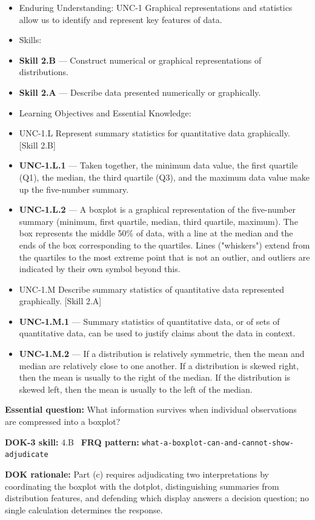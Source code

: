 \documentclass[11pt]{article}
\begin{document}


{\small
\begin{itemize}[leftmargin=1.5em,itemsep=2pt,topsep=2pt]
  \item Enduring Understanding: UNC-1 Graphical representations and statistics allow us to identify and represent key features of data.
  \item Skills:
  \item \textbf{Skill 2.B} --- Construct numerical or graphical representations of distributions.
  \item \textbf{Skill 2.A} --- Describe data presented numerically or graphically.
  \item Learning Objectives and Essential Knowledge:
  \item UNC-1.L Represent summary statistics for quantitative data graphically. [Skill 2.B]
  \item \textbf{UNC-1.L.1} --- Taken together, the minimum data value, the first quartile (Q1), the median, the third quartile (Q3), and the maximum data value make up the five-number summary.
  \item \textbf{UNC-1.L.2} --- A boxplot is a graphical representation of the five-number summary (minimum, first quartile, median, third quartile, maximum). The box represents the middle 50\% of data, with a line at the median and the ends of the box corresponding to the quartiles. Lines ("whiskers") extend from the quartiles to the most extreme point that is not an outlier, and outliers are indicated by their own symbol beyond this.
  \item UNC-1.M Describe summary statistics of quantitative data represented graphically. [Skill 2.A]
  \item \textbf{UNC-1.M.1} --- Summary statistics of quantitative data, or of sets of quantitative data, can be used to justify claims about the data in context.
  \item \textbf{UNC-1.M.2} --- If a distribution is relatively symmetric, then the mean and median are relatively close to one another. If a distribution is skewed right, then the mean is usually to the right of the median. If the distribution is skewed left, then the mean is usually to the left of the median.
\end{itemize}
}
\textbf{Essential question:} What information survives when individual observations are compressed into a boxplot?\par
\textbf{DOK-3 skill:} 4.B \textperiodcentered\ \textbf{FRQ pattern:} {\small\texttt{what-\allowbreak{}a-\allowbreak{}boxplot-\allowbreak{}can-\allowbreak{}and-\allowbreak{}cannot-\allowbreak{}show-\allowbreak{}adjudicate}}\par
\textbf{DOK rationale:} Part (c) requires adjudicating two interpretations by coordinating the boxplot with the dotplot, distinguishing summaries from distribution features, and defending which display answers a decision question; no single calculation determines the response.\par
\end{document}
